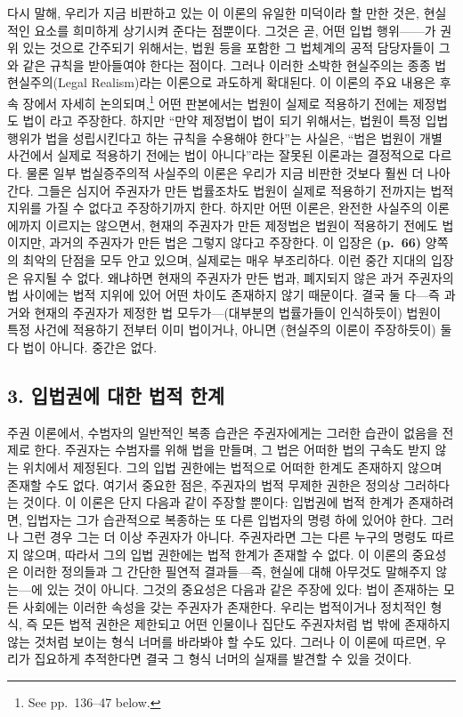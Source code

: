 다시 말해, 우리가 지금 비판하고 있는 이 이론의 유일한 미덕이라 할 만한
것은, 현실적인 요소를 희미하게 상기시켜 준다는 점뿐이다. 그것은 곧, 어떤
입법 행위------가
권위 있는 것으로 간주되기 위해서는, 법원 등을 포함한 그 법체계의 공적
담당자들이 그와 같은 규칙을 받아들여야 한다는 점이다. 그러나 이러한
소박한 현실주의는 종종 법현실주의(Legal Realism)라는 이론으로 과도하게
확대된다. 이 이론의 주요 내용은 후속 장에서 자세히 논의되며,\footnote{See
  pp.~136--47 below.} 어떤 판본에서는 법원이 실제로 적용하기 전에는
 제정법도 법이 라고 주장한다. 하지만 ``만약
제정법이 법이 되기 위해서는, 법원이 특정 입법 행위가 법을 성립시킨다고
하는 규칙을 수용해야 한다''는 사실은, ``법은 법원이 개별 사건에서 실제로
적용하기 전에는 법이 아니다''라는 잘못된 이론과는 결정적으로 다르다.
물론 일부 법실증주의적 사실주의 이론은 우리가 지금 비판한 것보다 훨씬 더
나아간다. 그들은 심지어  주권자가 만든 법률조차도
법원이 실제로 적용하기 전까지는 법적 지위를 가질 수 없다고 주장하기까지
한다. 하지만 어떤 이론은, 완전한 사실주의 이론에까지 이르지는 않으면서,
현재의 주권자가 만든 제정법은 법원이 적용하기 전에도 법이지만, 과거의
주권자가 만든 법은 그렇지 않다고 주장한다. 이 입장은 \textbf{(p.~66)}
양쪽의 최악의 단점을 모두 안고 있으며, 실제로는 매우 부조리하다. 이런
중간 지대의 입장은 유지될 수 없다. 왜냐하면 현재의 주권자가 만든 법과,
폐지되지 않은 과거 주권자의 법 사이에는 법적 지위에 있어 어떤 차이도
존재하지 않기 때문이다. 결국 둘 다---즉 과거와 현재의 주권자가 제정한 법
모두가---(대부분의 법률가들이 인식하듯이) 법원이 특정 사건에 적용하기
전부터 이미 법이거나, 아니면 (현실주의 이론이 주장하듯이) 둘 다 법이
아니다. 중간은 없다.

\subsection{3. 입법권에 대한 법적
한계}\label{uxc785uxbc95uxad8cuxc5d0-uxb300uxd55c-uxbc95uxc801-uxd55cuxacc4}

주권 이론에서, 수범자의 일반적인 복종 습관은 주권자에게는 그러한 습관이
없음을 전제로 한다. 주권자는 수범자를 위해 법을 만들며, 그 법은 어떠한
법의 구속도 받지 않는 위치에서 제정된다. 그의 입법 권한에는 법적으로
어떠한 한계도 존재하지 않으며 존재할 수도 없다. 여기서 중요한 점은,
주권자의 법적 무제한 권한은 정의상 그러하다는 것이다. 이 이론은 단지
다음과 같이 주장할 뿐이다: 입법권에 법적 한계가 존재하려면, 입법자는
그가 습관적으로 복종하는 또 다른 입법자의 명령 하에 있어야 한다. 그러나
그런 경우 그는 더 이상 주권자가 아니다. 주권자라면 그는 다른 누구의
명령도 따르지 않으며, 따라서 그의 입법 권한에는 법적 한계가 존재할 수
없다. 이 이론의 중요성은 이러한 정의들과 그 간단한 필연적 결과들---즉,
현실에 대해 아무것도 말해주지 않는---에 있는 것이 아니다. 그것의
중요성은 다음과 같은 주장에 있다: 법이 존재하는 모든 사회에는 이러한
속성을 갖는 주권자가 존재한다. 우리는 법적이거나 정치적인 형식, 즉 모든
법적 권한은 제한되고 어떤 인물이나 집단도 주권자처럼 법 밖에 존재하지
않는 것처럼 보이는 형식 너머를 바라봐야 할 수도 있다. 그러나 이 이론에
따르면, 우리가 집요하게 추적한다면 결국 그 형식 너머의 실재를 발견할 수
있을 것이다.

